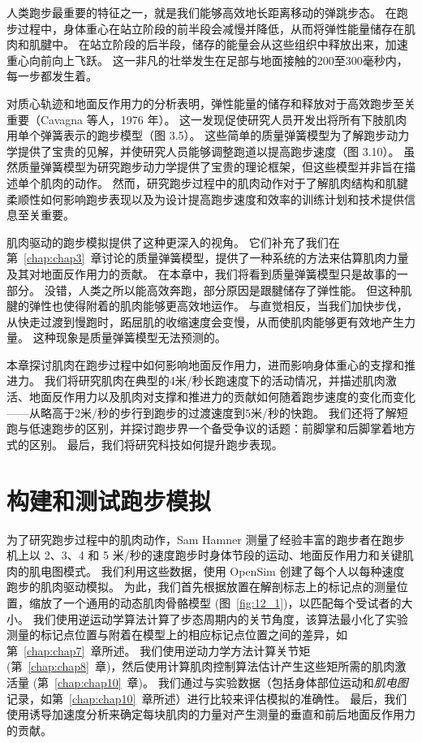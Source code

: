 人类跑步最重要的特征之一，就是我们能够高效地长距离移动的弹跳步态。
在跑步过程中，身体重心在站立阶段的前半段会减慢并降低，从而将弹性能量储存在肌肉和肌腱中。
在站立阶段的后半段，储存的能量会从这些组织中释放出来，加速重心向前向上飞跃。
这一非凡的壮举发生在足部与地面接触的200至300毫秒内，每一步都发生着。


对质心轨迹和地面反作用力的分析表明，弹性能量的储存和释放对于高效跑步至关重要（Cavagna 等人，1976 年）。
这一发现促使研究人员开发出将所有下肢肌肉用单个弹簧表示的跑步模型（图 3.5）。
这些简单的质量弹簧模型为了解跑步动力学提供了宝贵的见解，并使研究人员能够调整跑道以提高跑步速度（图 3.10）。
虽然质量弹簧模型为研究跑步动力学提供了宝贵的理论框架，但这些模型并非旨在描述单个肌肉的动作。
然而，研究跑步过程中的肌肉动作对于了解肌肉结构和肌腱柔顺性如何影响跑步表现以及为设计提高跑步速度和效率的训练计划和技术提供信息至关重要。


肌肉驱动的跑步模拟提供了这种更深入的视角。
它们补充了我们在第~\ref{chap:chap3}~章讨论的质量弹簧模型，提供了一种系统的方法来估算肌肉力量及其对地面反作用力的贡献。
在本章中，我们将看到质量弹簧模型只是故事的一部分。
没错，人类之所以能高效奔跑，部分原因是跟腱储存了弹性能。
但这种肌腱的弹性也使得附着的肌肉能够更高效地运作。
与直觉相反，当我们加快步伐，从快走过渡到慢跑时，跖屈肌的收缩速度会变慢，从而使肌肉能够更有效地产生力量。
这种现象是质量弹簧模型无法预测的。


本章探讨肌肉在跑步过程中如何影响地面反作用力，进而影响身体重心的支撑和推进力。
我们将研究肌肉在典型的4米/秒长跑速度下的活动情况，并描述肌肉激活、地面反作用力以及肌肉对支撑和推进力的贡献如何随着跑步速度的变化而变化——从略高于2米/秒的步行到跑步的过渡速度到5米/秒的快跑。
我们还将了解短跑与低速跑步的区别，并探讨跑步界一个备受争议的话题：前脚掌和后脚掌着地方式的区别。
最后，我们将研究科技如何提升跑步表现。


\section{构建和测试跑步模拟}

为了研究跑步过程中的肌肉动作，Sam Hamner 测量了经验丰富的跑步者在跑步机上以 2、3、4 和 5 米/秒的速度跑步时身体节段的运动、地面反作用力和关键肌肉的肌电图模式\cite{hamner2013muscle}。
我们利用这些数据，使用 OpenSim 创建了每个人以每种速度跑步的肌肉驱动模拟。
为此，我们首先根据放置在解剖标志上的标记点的测量位置，缩放了一个通用的动态肌肉骨骼模型 (图~\ref{fig:12_1})，以匹配每个受试者的大小。
我们使用逆运动学算法计算了步态周期内的关节角度，该算法最小化了实验测量的标记点位置与附着在模型上的相应标记点位置之间的差异，如第~\ref{chap:chap7}~章所述。
我们使用逆动力学方法计算关节矩 (第~\ref{chap:chap8}~章)，然后使用计算肌肉控制算法估计产生这些矩所需的肌肉激活量 (第~\ref{chap:chap10}~章)。
我们通过与实验数据（包括身体部位运动和\textit{肌电图}记录，如第~\ref{chap:chap10}~章所述）进行比较来评估模拟的准确性。
最后，我们使用诱导加速度分析来确定每块肌肉的力量对产生测量的垂直和前后地面反作用力的贡献。


